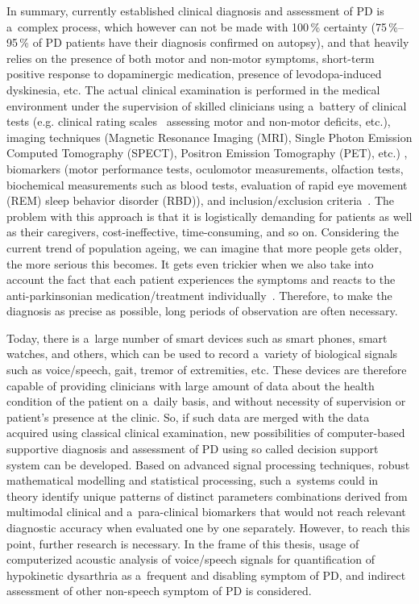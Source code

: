 In summary, currently established clinical diagnosis and assessment of PD is a~complex process, which however can not be made with 100\,\% certainty \cite{Hughes2002} (75\,\%--95\,\% of PD patients have their diagnosis confirmed on autopsy), and that heavily relies on the presence of both motor and non-motor symptoms, short-term positive response to dopaminergic medication, presence of levodopa-induced dyskinesia, etc. The actual clinical examination is performed in the medical environment under the supervision of skilled clinicians using a~battery of clinical tests (e.g. clinical rating scales~\cite{factor2007} assessing motor and non-motor deficits, etc.), imaging techniques (Magnetic Resonance Imaging (MRI), Single Photon Emission Computed Tomography (SPECT), Positron Emission Tomography (PET), etc.) \cite{Stern1989, Jankovic2008, Peran2010}, biomarkers (motor performance tests, oculomotor measurements, olfaction tests, biochemical measurements such as blood tests, evaluation of rapid eye movement (REM) sleep behavior disorder (RBD)), and inclusion/exclusion criteria~\cite{Hughes1992, Gelb1999, Albanese2003, Postuma2015}. The problem with this approach is that it is logistically demanding for patients as well as their caregivers, cost-ineffective, time-consuming, and so on. Considering the current trend of population ageing, we can imagine that more people gets older, the more serious this becomes. It gets even trickier when we also take into account the fact that each patient experiences the symptoms and reacts to the anti-parkinsonian medication/treatment individually~\cite{Grosset2009}. Therefore, to make the diagnosis as precise as possible, long periods of observation are often necessary.

Today, there is a~large number of smart devices such as smart phones, smart watches, and others, which can be used to record a~variety of biological signals such as voice/speech, gait, tremor of extremities, etc. These devices are therefore capable of providing clinicians with large amount of data about the health condition of the patient on a~daily basis, and without necessity of supervision or patient's presence at the clinic. So, if such data are merged with the data acquired using classical clinical examination, new possibilities of computer-based supportive diagnosis and assessment of PD using so called decision support system can be developed. Based on advanced signal processing techniques, robust mathematical modelling and statistical processing, such a~systems could in theory identify unique patterns of distinct parameters combinations derived from multimodal clinical and a~para-clinical biomarkers that would not reach relevant diagnostic accuracy when evaluated one by one separately. However, to reach this point, further research is necessary. In the frame of this thesis, usage of computerized acoustic analysis of voice/speech signals for quantification of hypokinetic dysarthria as a~frequent and disabling symptom of PD, and indirect assessment of other non-speech symptom of PD is considered.